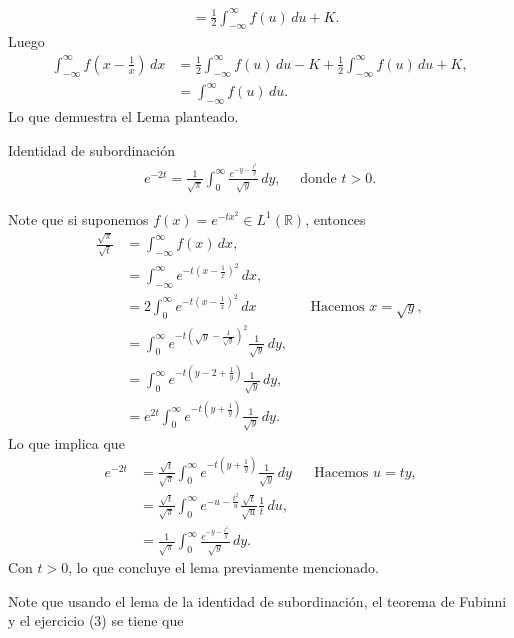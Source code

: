 \begin{homeworkProblem}
\begin{align*}
    &=\frac{1}{2}\int_{-\infty}^{\infty}f(u)\, du + K.
  \end{align*}
  Luego
  \begin{align*}
    \int_{-\infty}^{\infty}f\left( x-\frac{1}{x} \right)\, dx&=\frac{1}{2}\int_{-\infty}^{\infty}f(u)\, du-K+\frac{1}{2}\int_{-\infty}^{\infty}f(u)\, du+K,\\
    &=\int_{-\infty}^{\infty}f(u)\, du.
  \end{align*}
  Lo que demuestra el Lema planteado.
  \begin{lemma}{Identidad de subordinación}\label{lemma:2}
    \begin{align*}
      e^{-2t}=\frac{1}{\sqrt{\pi}}\int_{0}^{\infty}\frac{e^{-y-\frac{t^2}{y}}}{\sqrt{y}}\, dy,\quad\text{ donde $t>0$.}
    \end{align*}
  \end{lemma}
  Note que si suponemos $f(x)=e^{-tx^2}\in L^1(\mathbb{R})$, entonces
  \begin{align*}
    \frac{\sqrt{\pi}}{\sqrt{t}}&=\int_{-\infty}^{\infty}f(x)\, dx,\\
    &=\int_{-\infty}^{\infty}e^{-t\left( x-\frac{1}{x} \right)^2}\, dx,\\
    &=2\int_{0}^{\infty}e^{-t\left( x-\frac{1}{x} \right)^2}\, dx &&\text{Hacemos $x=\sqrt{y}$},\\
    &=\int_{0}^{\infty}e^{-t\left( \sqrt{y}-\frac{1}{\sqrt{y}}\right)^2}\frac{1}{\sqrt{y}}\, dy,\\
    &=\int_{0}^{\infty}e^{-t\left( y-2+\frac{1}{y} \right)}\frac{1}{\sqrt{y}}\, dy,\\
    &=e^{2t}\int_{0}^{\infty}e^{-t\left( y+\frac{1}{y} \right)}\frac{1}{\sqrt{y}}\, dy.
  \end{align*}
  \vspace{-0.5cm}
  Lo que implica que
  \begin{align*}
    e^{-2t}&=\frac{\sqrt{t}}{\sqrt{\pi}}\int_{0}^{\infty}e^{-t\left( y+\frac{1}{y} \right)}\frac{1}{\sqrt{y}}\, dy&&\text{Hacemos $u=ty$,}\\
    &=\frac{\sqrt{t}}{\sqrt{\pi}}\int_{0}^{\infty}e^{-u-\frac{t^2}{u}}\frac{\sqrt{t}}{\sqrt{u}}\frac{1}{t}\, du,\\
    &=\frac{1}{\sqrt{\pi}}\int_{0}^{\infty}\frac{e^{-y-\frac{t^2}{y}}}{\sqrt{y}}\, dy.
  \end{align*}
  Con $t>0$, lo que concluye el lema previamente mencionado.
  \begin{solution}
    Note que usando el lema de la identidad de subordinación, el teorema de Fubinni  y el ejercicio (3) se tiene que

\end{solution}
\end{homeworkProblem}
